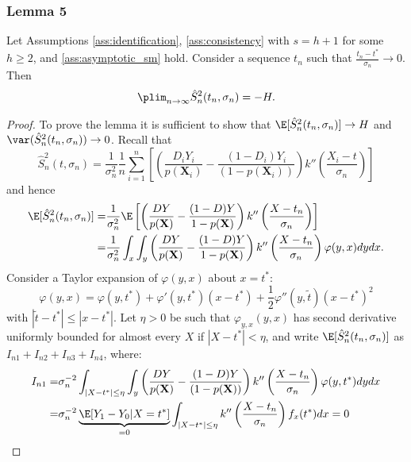 {\subsubsection*{Lemma 5}
    \begin{lem}\label{lemma5}
        Let Assumptions \ref{ass:identification}, \ref{ass:consistency} with $s=h + 1$ for some $h\geq 2$, and \ref{ass:asymptotic_sm} hold. Consider a sequence $t_n$ such that $\frac{t_n - t^*}{\sigma_n} \rightarrow 0$. Then
        \begin{gather}
            \plim_{n \rightarrow \infty} \hat{S}^2_n(t_n,\sigma_n) = -H.
        \end{gather}
    \end{lem}
    \begin{proof}
        To prove the lemma it is sufficient to show that $\E[\hat{S}^2_n(t_n,\sigma_n)] \rightarrow H$ and $\var(\hat{S}^2_n(t_n,\sigma_n)) \rightarrow 0$. Recall that $$\hat{S}_n^2(t,\sigma_n) = \frac{1}{\sigma_n^2} \frac{1}{n} \sum_{i=1}^n \left[\left(\frac{D_i Y_i}{p(\textbf{X}_i)} - \frac{(1-D_i) Y_i}{(1-p(\textbf{X}_i))} \right) k''\left(\frac{X_i - t}{\sigma_n} \right) \right]$$ and hence 
        \begin{align}
            \E[\hat{S}^2_n(t_n,\sigma_n)] =& \frac{1}{\sigma_n^2} \E\left[ \left(\frac{D Y}{p(\textbf{X})} - \frac{(1-D) Y}{1-p(\textbf{X})} \right) k''\left(\frac{X - t_n}{\sigma_n} \right) \right] \\
            =& \frac{1}{\sigma_n^2} \int_x \int_y \left(\frac{D Y}{p(\textbf{X})} - \frac{(1-D) Y}{1-p(\textbf{X})} \right) k''\left(\frac{X - t_n}{\sigma_n} \right) \varphi(y,x) dy dx.
        \end{align}
        Consider a Taylor expansion of $\varphi(y,x)$ about $x=t^*$: $$ \varphi(y,x) = \varphi(y,t^*) + \varphi'(y,t^*)(x - t^*) + \frac{1}{2} \varphi''(y,\tilde{t})(x - t^*)^2$$ with $|\tilde{t}-t^*| \leq |x - t^*|$. Let $\eta > 0$ be such that $\varphi_{y,x}(y,x)$ has second derivative uniformly bounded for almost every $X$ if $|X-t^*|<\eta$, and write $\E[\hat{S}^2_n(t_n,\sigma_n)]$ as $I_{n1}+I_{n2}+I_{n3}+I_{n4}$, where:
        \begin{align}
            I_{n1} =& \sigma_n^{-2} \int_{|X-t^*| \leq \eta} \int_y \left(\frac{D Y}{p(\textbf{X})} - \frac{(1-D) Y}{(1-p(\textbf{X}))} \right) k''\left(\frac{X - t_n}{\sigma_n} \right) \varphi(y,t^*) dy dx \\
            =& \sigma_n^{-2} \underbrace{\E[Y_1 -Y_0|X=t^*]}_{=0} \int_{|X-t^*| \leq \eta} k''\left(\frac{X - t_n}{\sigma_n} \right) f_x(t^*) dx = 0 \\

\end{align}
\end{proof}}
